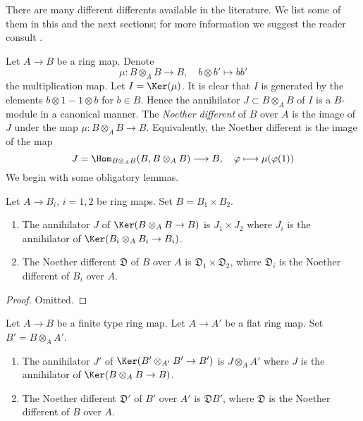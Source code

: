 \noindent
There are many different differents available in the literature.
We list some of them in this and the next sections; for more
information we suggest the reader consult \cite{Kunz}.

\medskip\noindent
Let $A \to B$ be a ring map. Denote
$$
\mu : B \otimes_A B \longrightarrow B,\quad
b \otimes b' \longmapsto bb'
$$
the multiplication map. Let $I = \Ker(\mu)$. It is clear that $I$ is
generated by the elements $b \otimes 1 - 1 \otimes b$ for $b \in B$.
Hence the annihilator $J \subset B \otimes_A B$ of $I$ is a $B$-module
in a canonical manner. The {\it Noether different} of $B$ over $A$ is
the image of $J$ under the map $\mu : B \otimes_A B \to B$. Equivalently,
the Noether different is the image of the map
$$
J = \Hom_{B \otimes_A B}(B, B \otimes_A B) \longrightarrow B,\quad
\varphi \longmapsto \mu(\varphi(1))
$$
We begin with some obligatory lemmas.

\begin{lemma}
\label{lemma-noether-different-product}
Let $A \to B_i$, $i = 1, 2$ be ring maps. Set $B = B_1 \times B_2$.
\begin{enumerate}
\item The annihilator $J$ of $\Ker(B \otimes_A B \to B)$ is $J_1 \times J_2$
where $J_i$ is the annihilator of $\Ker(B_i \otimes_A B_i \to B_i)$.
\item The Noether different $\mathfrak{D}$ of $B$ over $A$ is
$\mathfrak{D}_1 \times \mathfrak{D}_2$, where $\mathfrak{D}_i$ is
the Noether different of $B_i$ over $A$.
\end{enumerate}
\end{lemma}

\begin{proof}
Omitted.
\end{proof}

\begin{lemma}
\label{lemma-noether-different-base-change}
Let $A \to B$ be a finite type ring map. Let $A \to A'$ be a flat ring map.
Set $B' = B \otimes_A A'$.
\begin{enumerate}
\item The annihilator $J'$ of $\Ker(B' \otimes_{A'} B' \to B')$ is
$J \otimes_A A'$ where $J$ is the annihilator of $\Ker(B \otimes_A B \to B)$.
\item The Noether different $\mathfrak{D}'$ of $B'$ over $A'$ is
$\mathfrak{D}B'$, where $\mathfrak{D}$ is
the Noether different of $B$ over $A$.
\end{enumerate}
\end{lemma}


